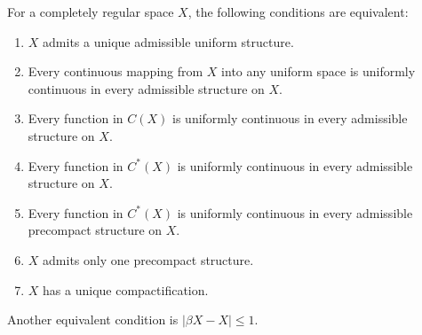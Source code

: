 For a completely regular space $X$, the following conditions are equivalent:
\begin{enumerate}
\item[(1)] $X$ admits a unique admissible uniform structure.
\item[(2)] Every continuous mapping from $X$ into any uniform space is uniformly continuous in every admissible structure on $X$.
\item[(3)] Every function in $C(X)$ is uniformly continuous in every admissible structure on $X$.
\item[(4)] Every function in $C^*(X)$ is uniformly continuous in every admissible structure on $X$.
\item[(5)] Every function in $C^*(X)$ is uniformly continuous in every admissible precompact structure on $X$.
\item[(6)] $X$ admits only one precompact structure.
\item[(7)] $X$ has a unique compactification.
\end{enumerate}
Another equivalent condition is $|\beta X - X| \leq 1$.
